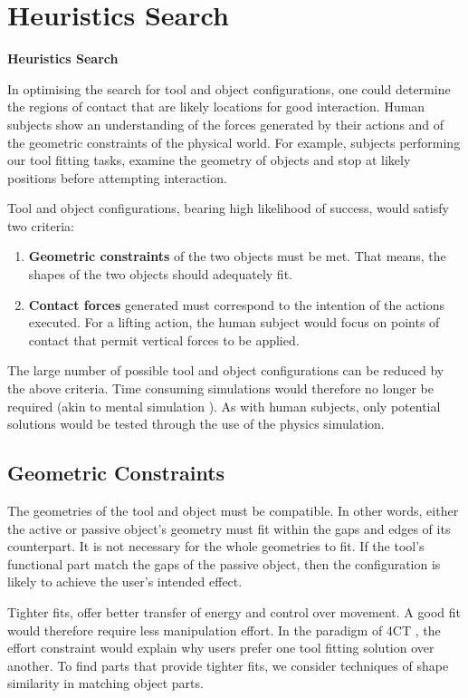 \documentclass[11]{article}
\let \shorttitle \textbf
\begin{document}
\section{Heuristics Search}

\shorttitle{Heuristics Search}

In optimising the search for tool and object configurations, one could determine the regions of contact that are likely locations for good interaction.
Human subjects show an understanding of the forces generated by their actions and of the geometric constraints of the physical world.
For example, subjects performing our tool fitting tasks, examine the geometry of objects and stop at likely positions before attempting interaction.  

Tool and object configurations, bearing high likelihood of success, would satisfy two criteria: 
\begin{enumerate}
\item \textbf{Geometric constraints} of the two objects must be met. That means, the shapes of the two objects should adequately fit.
\item \textbf{Contact forces} generated must correspond to the intention of the actions executed. 
  For a lifting action, the human subject would focus on points of contact that permit vertical forces to be applied.
\end{enumerate}

The large number of possible tool and object configurations can be reduced by the above criteria. Time consuming simulations would therefore no longer be required (akin to mental simulation \cite{osiurak2014}).
As with human subjects, only potential solutions would be tested through the use of the physics simulation. 

\subsection{Geometric Constraints}
The geometries of the tool and object must be compatible.
In other words, either the active or passive object’s geometry must fit within the gaps and edges of its counterpart.
It is not necessary for the whole geometries to fit.  
If the tool's functional part match the gaps of the passive object, then the configuration is likely to achieve the user's intended effect. 

Tighter fits, offer better transfer of energy and control over movement.
A good fit would therefore require less manipulation effort.
In the paradigm of 4CT \cite{osiurak2014}, the effort constraint would explain why users prefer one tool fitting solution over another. 
To find parts that provide tighter fits, we consider techniques of shape similarity in matching object parts.
\end{document}

